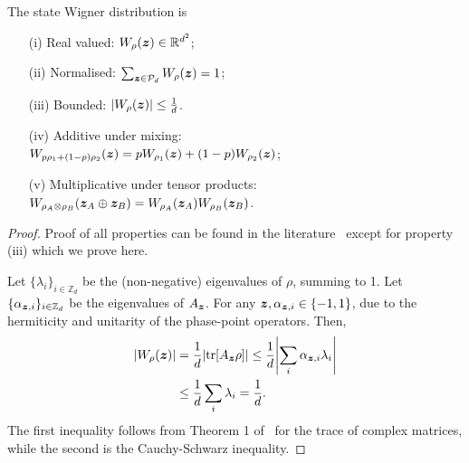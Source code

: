 \documentclass[pra,
aps,
twocolumn,
superscriptaddress,
groupedaddress,
nofootinbib,
reprint
]{revtex4-1}
\begin{document}
\begin{proposition}\label{thm:wstate}
  The state Wigner distribution is
  \begin{enumerate}
    \item[(i)]\label{en:w1} Real valued: $\W{\rho}(\bmz) \in \mathbb{R}^{d^2}$;
    \item[(ii)]\label{en:w2} Normalised: $\sum_{\bmz \in \cal{P}_d} \W[\bmz]{\rho}=1$;
    \item[(iii)]\label{en:w3} Bounded: $\abs{\W[\bmz]{\rho}} \leq \frac{1}{d}$.
    \item[(iv)]\label{en:w4} Additive under mixing: \vspace{2pt}\\
    $\W[\bmz]{p\rho_1 + (1-p)\rho_2} = p\W[\bmz]{\rho_1} + (1-p)\W[\bmz]{\rho_2}$;
    \item[(v)]\label{en:w5} Multiplicative under tensor products: \vspace{2pt}\\
    $\W[\bmz_A \oplus \bmz_B]{\rho_A \otimes \rho_B} = \W[\bmz_A]{\rho_A}\W[\bmz_B]{\rho_B}$.
	\end{enumerate}
\end{proposition}
\begin{proof}
	Proof of all properties can be found in the literature~\cite{cit:veitch,Vourdas_2004,cit:gross3,Wang_2019} except for property (iii) which we prove here.
	
Let $\{\lambda_i\}_{i \in \mathbb{Z}_d}$ be the (non-negative) eigenvalues of $\rho$, summing to 1.
Let $\{\alpha_{\bm{z},i}\}_{i \in \mathbb{Z}_d}$ be the eigenvalues of $A_{\bm{z}}$. For any $\bm{z}, \alpha_{\bm{z},i} \in \{-1, 1\}$, due to the hermiticity and unitarity of the phase-point operators. 
Then,
\begin{align}
	\abs{W_{\rho}(\bm{z})} &= \frac{1}{d}\abs{\mbox{tr}[A_{\bm{z}} \rho]} \leq \frac{1}{d} \abs{\sum_i \alpha_{\bm{z},i} \lambda_i} \nonumber\\ &\leq \frac{1}{d}\sum_i \lambda_i = \frac{1}{d}.
\end{align}
The first inequality follows from Theorem 1 of~\cite{cit:mirsky} for the trace of complex matrices, while the second is the Cauchy-Schwarz inequality.
\end{proof}
\end{document}
